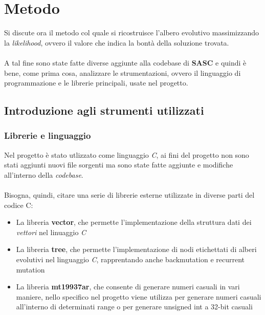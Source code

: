 \documentclass[12pt]{report}
\begin{document}
\chapter{Metodo}
  Si discute ora il metodo col quale si ricostruisce l'albero evolutivo massimizzando la \emph{likelihood}, ovvero il valore che indica la bontà della soluzione trovata.\\\\
  A tal fine sono state fatte diverse aggiunte alla codebase di \textbf{SASC} e quindi è bene, come prima cosa, analizzare le strumentazioni, ovvero il linguaggio di programmazione e le librerie principali, usate nel progetto.

  \section{Introduzione agli strumenti utilizzati}
  \subsection{Librerie e linguaggio}

  Nel progetto è stato utlizzato come linguaggio \emph{C}, ai fini del progetto non sono stati aggiunti nuovi file sorgenti ma sono state fatte aggiunte e modifiche all'interno della \textit{codebase}.\\\\
  Bisogna, quindi, citare una serie di librerie esterne utilizzate in diverse parti del codice C:
  \begin{itemize}
    \item La libreria \textbf{vector}, che permette l'implementazione della struttura dati dei \textit{vettori} nel linuaggio \textit{C}

    \item La libreria \textbf{tree}, che permette l'implementazione di nodi etichettati di alberi evolutivi nel linguaggio \textit{C}, rapprentando anche backmutation e recurrent mutation

    \item La libreria \textbf{mt19937ar}\cite{mt19937ar}, che consente di generare numeri casuali in vari maniere, nello specifico nel progetto viene utilizza per generare numeri casuali all'interno di determinati range o per generare unsigned int a 32-bit casuali
  \end{itemize}
\end{document}
